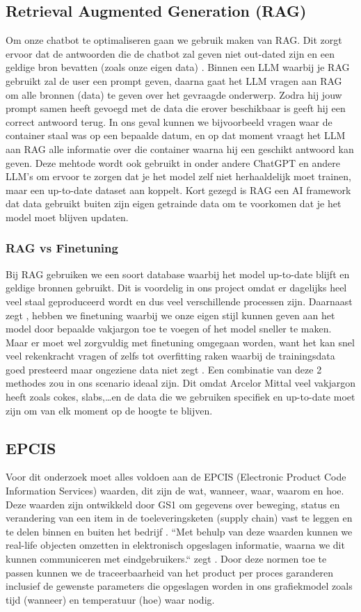 \subsection{Retrieval Augmented Generation (RAG)}
Om onze chatbot te optimaliseren gaan we gebruik maken van RAG.
Dit zorgt ervoor dat de antwoorden die de chatbot zal geven niet out-dated zijn en een geldige bron bevatten (zoals onze eigen data) \autocite{IBM2023}.
Binnen een LLM waarbij je RAG gebruikt zal de user een prompt geven, daarna gaat het LLM vragen aan RAG om alle bronnen (data) te geven over het gevraagde onderwerp.
Zodra hij jouw prompt samen heeft gevoegd met de data die erover beschikbaar is geeft hij een correct antwoord terug.
In ons geval kunnen we bijvoorbeeld vragen waar de container staal was op een bepaalde datum, en op dat moment vraagt het LLM aan RAG alle informatie over die container waarna hij een geschikt antwoord kan geven.
Deze mehtode wordt ook gebruikt in onder andere ChatGPT en andere LLM's om ervoor te zorgen dat je het model zelf niet herhaaldelijk moet trainen, maar een up-to-date dataset aan koppelt.
Kort gezegd is RAG een AI framework dat data gebruikt buiten zijn eigen getrainde data om te voorkomen dat je het model moet blijven updaten.
\subsubsection{RAG vs Finetuning}
Bij RAG gebruiken we een soort database waarbij het model up-to-date blijft en geldige bronnen gebruikt. Dit is voordelig in ons project omdat er dagelijks heel veel staal geproduceerd wordt en dus veel verschillende processen zijn.
Daarnaast zegt \textcite{IBM2024}, hebben we finetuning waarbij we onze eigen stijl kunnen geven aan het model door bepaalde vakjargon toe te voegen of het model sneller te maken.
Maar er moet wel zorgvuldig met finetuning omgegaan worden, want het kan snel veel rekenkracht vragen of zelfs tot overfitting raken waarbij de trainingsdata goed presteerd maar ongeziene data niet zegt \textcite{EASIIO2022}.
Een combinatie van deze 2 methodes zou in ons scenario ideaal zijn. Dit omdat Arcelor Mittal veel vakjargon heeft zoals cokes, slabs,\dots en de data die we gebruiken specifiek en up-to-date moet zijn om van elk moment op de hoogte te blijven.


\subsection{EPCIS}
Voor dit onderzoek moet alles voldoen aan de EPCIS (Electronic Product Code Information Services) waarden, dit zijn de wat, wanneer, waar, waarom en hoe. 
Deze waarden zijn ontwikkeld door GS1 om gegevens over beweging, status en verandering van een item in de toeleveringsketen (supply chain) vast te leggen en te delen binnen en buiten het bedrijf \autocite{Devins}.
``Met behulp van deze waarden kunnen we real-life objecten omzetten in elektronisch opgeslagen informatie, waarna we dit kunnen communiceren met eindgebruikers.`` zegt \textcite{Devins}.
Door deze normen toe te passen kunnen we de traceerbaarheid van het product per proces garanderen inclusief de gewenste parameters die opgeslagen worden in ons grafiekmodel zoals tijd (wanneer) en temperatuur (hoe) waar nodig.
